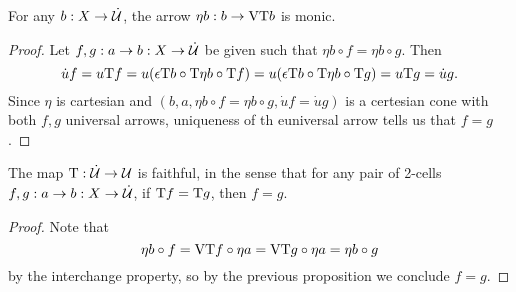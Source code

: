 \documentclass[../thesis.tex]{subfiles}
\begin{document}
\begin{proposition}
  For any $b : X \to \dot{{\mathcal{U}}}$, the arrow $\eta b : b \to {{\mathrm{V}}}{{\mathrm{T}}} b$ is monic.
\end{proposition}
\begin{proof}
  Let $f,g : a \to b : X \to \dot{{\mathcal{U}}}$ be given such that $\eta b \circ f = \eta b \circ g$. Then 
  \[\dot u f = u{{\mathrm{T}}} f = u(\epsilon{{\mathrm{T}}} b \circ {{\mathrm{T}}}\eta b \circ {{\mathrm{T}}} f) = 
  u(\epsilon{{\mathrm{T}}} b \circ {{\mathrm{T}}}\eta b \circ {{\mathrm{T}}} g) = u{{\mathrm{T}}} g = \dot u g.\]
  Since $\eta$ is cartesian and $(b,a,\eta b \circ f = \eta b \circ g, \dot u f = \dot u g)$ is a certesian
  cone with both $f,g$ universal arrows, uniqueness of th euniversal arrow tells us that $f = g$.
\end{proof}

\begin{proposition}
  The map ${{\mathrm{T}}} : \dot{{\mathcal{U}}} \to {\mathcal{U}}$ is faithful, in the sense that for any pair of 2-cells $f,g : a \to b
  : X \to \dot{{\mathcal{U}}}$, if ${{\mathrm{T}}} f = {{\mathrm{T}}} g$, then $f = g$. 
\end{proposition}
\begin{proof}
  Note that
  \[\eta b \circ f = {{\mathrm{V}}}{{\mathrm{T}}} f \circ \eta a = {{\mathrm{V}}}{{\mathrm{T}}} g \circ \eta a = \eta b \circ g\]
  by the interchange property, so by the previous proposition we conclude $f = g$.
\end{proof}
\end{document}
